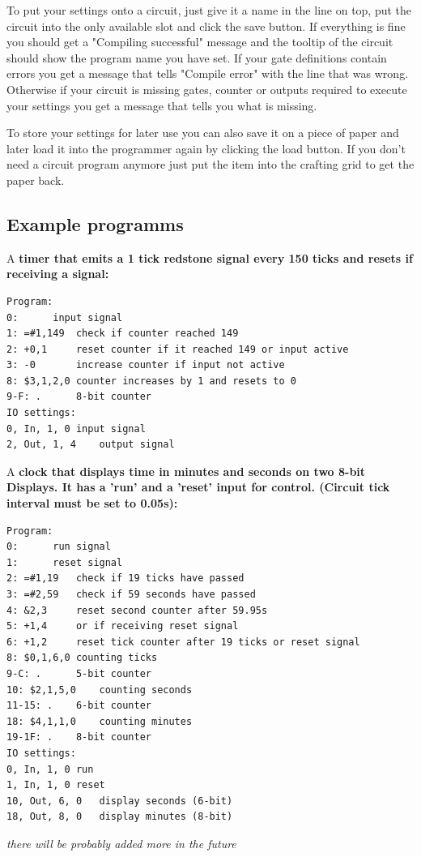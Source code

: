 \documentclass[11pt]{article} %
\begin{document}
To put your settings onto a circuit, just give it a name in the line on top, put the circuit into the only available slot and click the save button. If everything is fine you should get a "Compiling successful" message and the tooltip of the circuit should show the program name you have set. If your gate definitions contain errors you get a message that tells "Compile error" with the line that was wrong. Otherwise if your circuit is missing gates, counter or outputs required to execute your settings you get a message that tells you what is missing.

To store your settings for later use you can also save it on a piece of paper and later load it into the programmer again by clicking the load button. If you don't need a circuit program anymore just put the item into the crafting grid to get the paper back.

\subsection{Example programms}
A \bf timer \rm that emits a 1 tick redstone signal every 150 ticks and resets if receiving a signal:
\begin{lstlisting}
Program:
0:		input signal
1: =#1,149	check if counter reached 149
2: +0,1		reset counter if it reached 149 or input active
3: -0		increase counter if input not active
8: $3,1,2,0	counter increases by 1 and resets to 0
9-F: .		8-bit counter
IO settings:
0, In, 1, 0	input signal
2, Out, 1, 4	output signal
\end{lstlisting}
A \bf clock \rm that displays time in minutes and seconds on two 8-bit Displays. It has a 'run' and a 'reset' input for control. (Circuit tick interval must be set to 0.05s):
\begin{lstlisting}
Program:
0:		run signal
1:		reset signal
2: =#1,19	check if 19 ticks have passed
3: =#2,59	check if 59 seconds have passed
4: &2,3		reset second counter after 59.95s
5: +1,4		or if receiving reset signal
6: +1,2		reset tick counter after 19 ticks or reset signal
8: $0,1,6,0	counting ticks
9-C: .		5-bit counter
10: $2,1,5,0	counting seconds
11-15: .	6-bit counter
18: $4,1,1,0	counting minutes
19-1F: .	8-bit counter
IO settings:
0, In, 1, 0	run
1, In, 1, 0	reset
10, Out, 6, 0	display seconds (6-bit)
18, Out, 8, 0	display minutes (8-bit)
\end{lstlisting}

\it there will be probably added more in the future \rm
\end{document}
